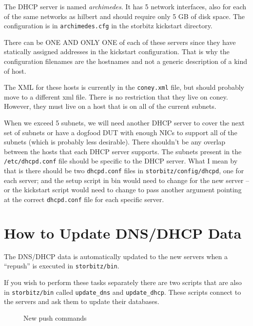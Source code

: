 \documentclass[twoside]{article}
\begin{document}
The DHCP server is named {\em archimedes}.
It has 5 network interfaces, also for each of the same networks
as hilbert and should require only 5 GB of disk space.
The configuration is in \verb+archimedes.cfg+ in the storbitz
kickstart directory.

There can be ONE AND ONLY ONE of each of these servers
since they have statically assigned addresses in the kickstart
configuration.
That is why the configuration filenames are the hostnames and
not a generic description of a kind of host.

The XML for these hosts is currently in the \verb+coney.xml+ 
file, but should probably move to a different xml file.
There is no restriction that they live on coney.
However, they must live on a host that is on all of the
current subnets.

When we exceed 5 subnets, we will need another DHCP server to cover
the next set of subnets or have a dogfood DUT with enough NICs to
support all of the subnets (which is probably less desirable).
There shouldn't be any overlap between the hosts that each DHCP
server supports.
The subnets present in the \verb+/etc/dhcpd.conf+ file should be
specific to the DHCP server.
What I mean by that is there should be two \verb+dhcpd.conf+
files in \verb+storbitz/config/dhcpd+, one for each server;
and the setup script in bin would need to change for the
new server -- or the kickstart script would need to change to
pass another argument pointing at the correct \verb+dhcpd.conf+
file for each specific server.

\section{How to Update DNS/DHCP Data}

The DNS/DHCP data is automatically updated to the new servers when
a ``repush'' is executed in \verb+storbitz/bin+.

If you wish to perform these tasks separately there are two scripts
that are also in \verb+storbitz/bin+ called \verb+update_dns+ and 
\verb+update_dhcp+.
These scripts connect to the servers and ask them to update their
databases.

\begin{figure}[!h]
\begin{center}
\end{center}
\caption{New push commands}\label{push:commands}
\end{figure}
\end{document}
